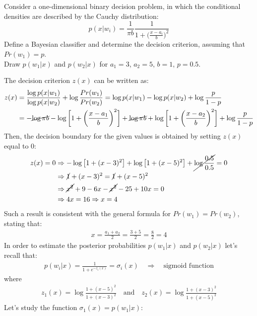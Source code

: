 \Exercise[number={9}]
Consider a one-dimensional binary decision problem, in which the conditional
densities are described by the Cauchy distribution:
\[
    p(x|w_i)=\frac{1}{\pi b}\frac{1}{1+\bigl(\frac{x-a_i}{b}\bigr)^2}
\]
Define a Bayesian classifier and determine the decision criterion,
assuming that \(Pr(w_1)=p\).\\
Draw \(p(w_1|x)\) and \(p(w_2|x)\) for \(a_1=3\), \(a_2=5\), \(b=1\),
\(p=0.5\).

\Answer[number={9}]
The decision criterion \(z(x)\) can be written as:
\begin{align*}
    z(x)
    &=\frac{\log{p(x|w_1)}}{\log{p(x|w_2)}}+\log{\frac{Pr(w_1)}{Pr(w_2)}}
    =\log{p(x|w_1)}-\log{p(x|w_2)}+\log{\frac{p}{1-p}}\\
    &=-\cancel{\log{\pi b}}-\log{\biggl[1+\biggl(\frac{x-a_1}{b}\biggr)^2\biggr]}+\cancel{\log{\pi b}}+\log{\biggl[1+\biggl(\frac{x-a_2}{b}\biggr)^2\biggr]}+\log{\frac{p}{1-p}}
\end{align*}
Then, the decision boundary for the given values is obtained by setting
\(z(x)\) equal to 0:
\begin{align*}
    z(x)=0
    &\Rightarrow
    -\log{\bigl[1+(x-3)^2\bigr]}+\log{\bigl[1+(x-5)^2\bigr]}+\cancel{\log{\frac{0.5}{0.5}}}=0\\
    &\Rightarrow
    \cancel{1}+(x-3)^2=\cancel{1}+(x-5)^2\\
    &\Rightarrow
    \cancel{x^2}+9-6x-\cancel{x^2}-25+10x=0\\
    &\Rightarrow
    4x=16
    \Rightarrow
    x=4
\end{align*}
Such a result is consistent with the general formula for \(Pr(w_1)=Pr(w_2)\),
stating that:
\begin{align*}
    x=\frac{a_1+a_2}{2}=\frac{3+5}{2}=\frac{8}{2}=4
\end{align*}
In order to estimate the posterior probabilities \(p(w_1|x)\) and \(p(w_2|x)\)
let's recall that:
\begin{align*}
    p(w_i|x)=\frac{1}{1+e^{-z_i(x)}}=\sigma_i(x)
    \quad\Longrightarrow\quad
    \text{sigmoid function}
\end{align*}
where
\begin{align*}
    z_1(x)=\log{\frac{1+(x-5)^2}{1+(x-3)^2}}
    \quad\text{and}\quad
    z_2(x)=\log{\frac{1+(x-3)^2}{1+(x-5)^2}}
\end{align*}
Let's study the function \(\sigma_1(x)=p(w_1|x)\):
